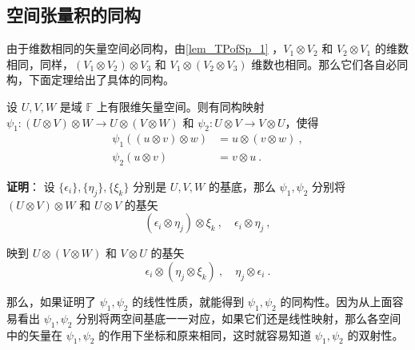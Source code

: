 \subsection{空间张量积的同构}
由于维数相同的矢量空间必同构，由\autoref{lem_TPofSp_1} ，$V_1\otimes V_2$ 和 $V_2\otimes V_1$ 的维数相同，同样，$(V_1\otimes V_2)\otimes V_3$ 和 $V_1\otimes( V_2\otimes V_3)$ 维数也相同。那么它们各自必同构，下面定理给出了具体的同构。
\begin{theorem}{}\label{the_TPofSp_2}
设 $U,V,W$ 是域 $\mathbb F$ 上有限维矢量空间。则有同构映射 $\psi_1:(U\otimes V)\otimes W\rightarrow U\otimes(V\otimes W)$ 和 $\psi_2:U\otimes V\rightarrow V\otimes U$，使得
\begin{equation}
\begin{aligned}
\psi_1((u\otimes v)\otimes w)&=u\otimes(v\otimes w)~,\\
\psi_2(u\otimes v)&=v\otimes u~.
\end{aligned}
\end{equation}
\end{theorem}
\textbf{证明}： 设 $\{\epsilon_i\},\{\eta_j\},\{\xi_k\}$ 分别是 $U,V,W$ 的基底，那么 $\psi_1,\psi_2$ 分别将 $(U\otimes V)\otimes W$ 和 $U\otimes V$ 的基矢
\begin{equation}
(\epsilon_i\otimes\eta_j)\otimes\xi_k~,\quad \epsilon_i\otimes\eta_j~,
\end{equation}

映到 $U\otimes (V\otimes W)$ 和 $V\otimes U$ 的基矢 
\begin{equation}
\epsilon_i\otimes(\eta_j\otimes\xi_k)~,\quad \eta_j\otimes\epsilon_i~.
\end{equation}

那么，如果证明了 $\psi_1,\psi_2$ 的线性性质，就能得到 $\psi_1,\psi_2$ 的同构性。因为从上面容易看出 $\psi_1,\psi_2$ 分别将两空间基底一一对应，如果它们还是线性映射，那么各空间中的矢量在 $\psi_1,\psi_2$ 的作用下坐标和原来相同，这时就容易知道 $\psi_1,\psi_2$ 的双射性。

